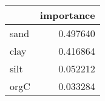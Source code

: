 \begin{tabular}{lr}
\toprule
 & importance \\
\midrule
sand & 0.497640 \\
clay & 0.416864 \\
silt & 0.052212 \\
orgC & 0.033284 \\
\bottomrule
\end{tabular}
